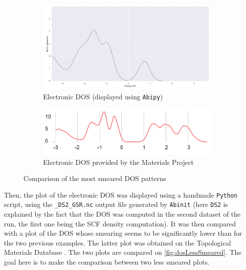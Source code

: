 \documentclass[11pt,a4paper]{article}
\begin{document}
\begin{figure}[H]
\centering
\begin{subfigure}[b]{0.95\textwidth}
\centering
\includegraphics[width=\textwidth]{images/dos1}
\caption{Electronic DOS (displayed using \texttt{Abipy})}
\label{fig:dos1}
\end{subfigure}

\begin{subfigure}[b]{0.95\textwidth}
\centering
\includegraphics[width=\textwidth]{images/dos4.png}
\caption{Electronic DOS provided by the Materials Project}
\label{fig:dos4}
\end{subfigure}
\caption{Comparison of the most smeared DOS patterns}
\label{fig:dosSmeared}
\end{figure}

Then, the plot of the electronic DOS was displayed using a handmade \texttt{Python} script, using the \texttt{\_DS2\_GSR.nc} output file generated by \texttt{Abinit} (here \texttt{DS2} is explained by the fact that the DOS was computed in the second dataset of the run, the first one being the SCF density computation). It was then compared with a plot of the DOS whose smearing seems to be significantly lower than for the two previous examples. The latter plot was obtained on the Topological Materials Database \cite{TMD1,TMD2,TMD3,TMD4,TMD5}.  The two plots are compared on \autoref{fig:dosLessSmeared}. The goal here is to make the comparison between two less smeared plots.
\end{document}
